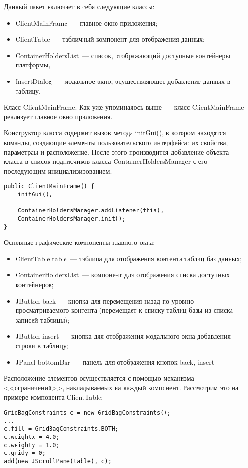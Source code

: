 Данный пакет включает в себя следующие классы:
\begin{itemize}
\item ClientMainFrame~--- главное окно приложения;
\item ClientTable~--- табличный компонент для отображения данных;
\item ContainerHoldersList~--- список, отображающий доступные контейнеры платформы;
\item InsertDialog~--- модальное окно, осуществляющее добавление данных в таблицу.
\end{itemize}

Класс ClientMainFrame. Как уже упоминалось выше~--- класс ClientMainFrame реализует главное окно приложения.

Конструктор класса содержит вызов метода initGui(), в котором находятся команды, создающие элементы пользовательского интерфейса: их свойства, параметраы и расположение. После этого производится добавление объекта класса в список подписчиков класса ContainerHoldersManager с его последующим инициализированием.
\begin{lstlisting}
public ClientMainFrame() {
    initGui();

    ContainerHoldersManager.addListener(this);
    ContainerHoldersManager.init();
}
\end{lstlisting}

Основные графические компоненты главного окна:
\begin{itemize}
\item ClientTable table~--- таблица для отображения контента таблиц баз данных;
\item ContainerHoldersList~--- компонент для отображения списка доступных контейнеров;
\item JButton back~--- кнопка для перемещения назад по уровню просматриваемого контента (перемещает к списку таблиц базы из списка записей таблицы);
\item JButton insert~--- кнопка для отображения модального окна добавления строки в таблицу;
\item JPanel bottomBar~--- панель для отображения кнопок back, insert.
\end{itemize}

Расположение элементов осуществляется с помощью механизма <<ограничений>>, накладываемых на каждый компонент. Рассмотрим это на примере компонента ClientTable:
\begin{lstlisting}
GridBagConstraints c = new GridBagConstraints();
...
c.fill = GridBagConstraints.BOTH;
c.weightx = 4.0;
c.weighty = 1.0;
c.gridy = 0;
add(new JScrollPane(table), c);
\end{lstlisting}

